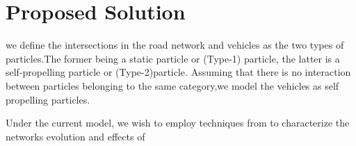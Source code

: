 \documentclass[a4paper,12pt]{scrartcl}
\begin{document}
\section*{Proposed Solution}
we define the intersections in the road network and vehicles as the two types of particles.The former being a static particle or (Type-1) particle, the latter is a self-propelling particle or (Type-2)particle. Assuming that there is no interaction between particles belonging to the same category,we model the vehicles as self propelling particles.

Under the current model, we wish to employ techniques from \cite{ChengCoRR2017} to characterize the networks evolution and effects of      




    
\end{document}
